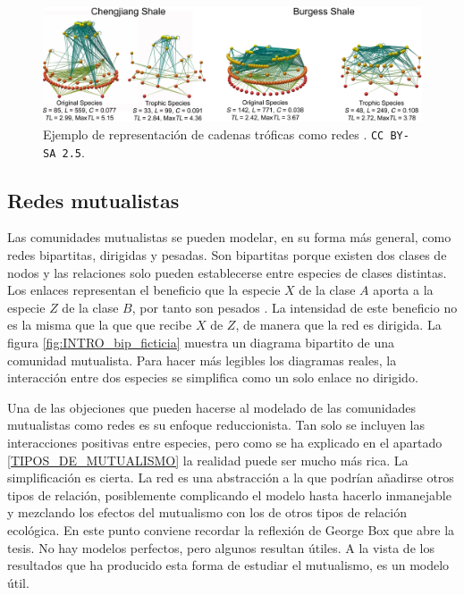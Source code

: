 \begin{figure}[h!]
\centering
\includegraphics[scale=0.75]{Figures/INTRO_Chengjiang_and_Burgess_Shale_1.png}
\caption{Ejemplo de representación de cadenas tróficas como redes \cite{dunne2008compilation}. \small{\texttt{CC BY-SA 2.5}}.}
\label{fig:INTRO_Chengjiang_and_Burgess_Shale_1}
\end{figure}


\subsection{Redes mutualistas}

Las comunidades mutualistas se pueden modelar, en su forma más general, como redes bipartitas, dirigidas y pesadas. Son bipartitas porque existen dos clases de nodos y las relaciones solo pueden establecerse entre especies de clases distintas. Los enlaces representan el beneficio que la especie $X$ de la clase $A$ aporta a la especie $Z$ de la clase $B$, por tanto son pesados \cite{barrat2004architecture}. La intensidad de este beneficio no es la misma que la que que recibe $X$ de $Z$, de manera que la red es dirigida. La figura \ref{fig:INTRO_bip_ficticia} muestra un diagrama bipartito de una comunidad mutualista. Para hacer más legibles los diagramas reales, la interacción entre dos especies se simplifica como un solo enlace no dirigido.

Una de las objeciones que pueden hacerse al modelado de las comunidades mutualistas como redes es su enfoque reduccionista. Tan solo se incluyen las interacciones positivas entre especies, pero como se ha explicado en el apartado \ref{TIPOS_DE_MUTUALISMO} la realidad puede ser mucho más rica. La simplificación es cierta. La red es una abstracción a la que podrían añadirse otros tipos de relación, posiblemente complicando el modelo hasta hacerlo inmanejable y mezclando los efectos del mutualismo con los de otros tipos de relación ecológica. En este punto conviene recordar la reflexión de George Box que abre la tesis. No hay modelos perfectos, pero algunos resultan útiles. A la vista de los resultados que ha producido esta forma de estudiar el mutualismo, es un modelo útil.

